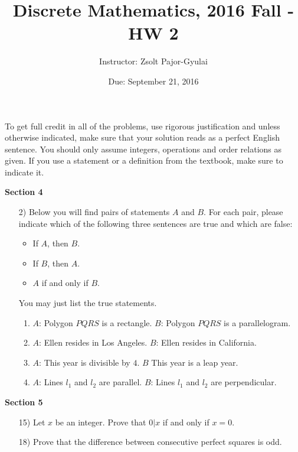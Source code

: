 \documentclass[11pt]{preprint}
\title{Discrete Mathematics, 2016 Fall - HW 2}
\author{Instructor: Zsolt Pajor-Gyulai}
\institute{Courant Institute of Mathematical Sciences, NYU}
\date{Due: September 21, 2016}
\begin{document}
\maketitle

To get full credit  in all of the problems, use rigorous justification and unless otherwise indicated, make sure that your solution reads as a perfect English sentence. You should only assume integers, operations and order relations as given. If you use a statement or a definition from the textbook, make sure to indicate it.
\vspace{0.2cm}

\textbf{Section 4}
\begin{enumerate}
\item[2)] Below you will find pairs of statements $A$ and $B$. For each pair, please indicate which of the following three sentences are true and which are false:
\begin{itemize}
\item If $A$, then $B$.
\item If $B$, then $A$.
\item $A$ if and only if $B$.
\end{itemize}
You may just list the true statements.
\begin{enumerate}
\item $A$: Polygon $PQRS$ is a rectangle.  $B$: Polygon $PQRS$ is a parallelogram.
\item $A$: Ellen resides in Los Angeles.  $B$: Ellen resides in California.
\item $A$: This year is divisible by $4$.  $B$ This year is a leap year.
\item $A$: Lines $l_1$ and $l_2$ are parallel. $B$: Lines $l_1$ and $l_2$ are perpendicular.
\end{enumerate}
\end{enumerate}

\textbf{Section 5}
\begin{enumerate}

\item[15)] Let $x$ be an integer. Prove that $0|x$ if and only if $x=0$.
\item[18)] Prove that the difference between consecutive perfect squares is odd.
\end{enumerate}
\end{document}
